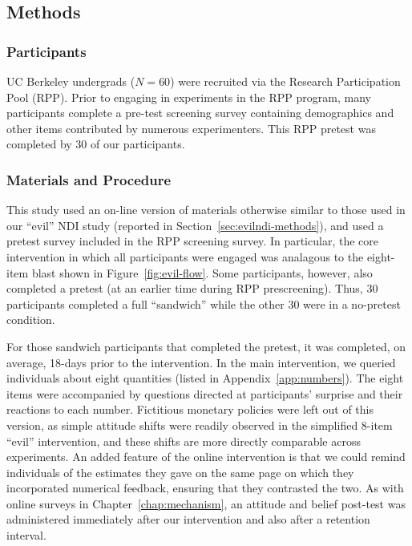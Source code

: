 \subsection{Methods}

\subsubsection{Participants}

UC Berkeley undergrads ($N=60$) were recruited via the Research Participation
Pool (RPP). Prior to engaging in experiments in the RPP program, many
participants complete a pre-test screening survey containing demographics and
other items contributed by numerous experimenters. This RPP pretest was
completed by 30 of our participants. 

\subsubsection{Materials and Procedure}

This study used an on-line version of materials otherwise similar to those used
in our “evil” NDI study (reported in Section~\ref{sec:evilndi-methods}), and
used a pretest survey included in the RPP screening survey. In particular, the
core intervention in which all participants were engaged was analagous to the
eight-item blast shown in Figure~\ref{fig:evil-flow}. Some participants,
however, also completed a pretest (at an earlier time during RPP prescreening).
Thus, 30 participants completed a full “sandwich” while the other 30 were in a
no-pretest condition. 

For those sandwich participants that completed the pretest, it was completed, on
average, 18-days prior to the intervention. In the main intervention, we queried
individuals about eight quantities (listed in Appendix~\ref{app:numbers}). The
eight items were accompanied by questions directed at participants’ surprise and
their reactions to each number.  Fictitious monetary policies were left out of
this version, as simple attitude shifts were readily observed in the simplified
8-item “evil” intervention, and these shifts are more directly comparable across
experiments.  An added feature of the online intervention is that we could
remind individuals of the estimates they gave on the same page on which they
incorporated numerical feedback, ensuring that they contrasted the two. As with
online surveys in Chapter~\ref{chap:mechanism}, an attitude and belief post-test
was administered immediately after our intervention and also after a retention
interval.


